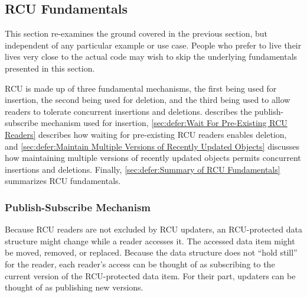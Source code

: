 
\subsection{RCU Fundamentals}
\label{sec:defer:RCU Fundamentals}

This section re-examines the ground covered in the previous section, but
independent of any particular example or use case.
People who prefer to live their lives very close to the actual code may
wish to skip the underlying fundamentals presented in this section.

RCU is made up of three fundamental mechanisms, the first being
used for insertion, the second being used for deletion, and the third
being used to allow readers to tolerate concurrent insertions and deletions.
describes the publish-subscribe mechanism used for insertion,
\cref{sec:defer:Wait For Pre-Existing RCU Readers}
describes how waiting for pre-existing RCU readers enables deletion,
and
\cref{sec:defer:Maintain Multiple Versions of Recently Updated Objects}
discusses how maintaining multiple versions of recently updated objects
permits concurrent insertions and deletions.
Finally,
\cref{sec:defer:Summary of RCU Fundamentals}
summarizes RCU fundamentals.

\subsubsection{Publish-Subscribe Mechanism}
\label{sec:defer:Publish-Subscribe Mechanism}

Because RCU readers are not excluded by RCU updaters, an RCU-protected
data structure might change while a reader accesses it.
The accessed data item might be moved, removed, or replaced.
Because the data structure does not ``hold still'' for the reader,
each reader's access can be thought of as subscribing to the current
version of the RCU-protected data item.
For their part, updaters can be thought of as publishing new versions.


